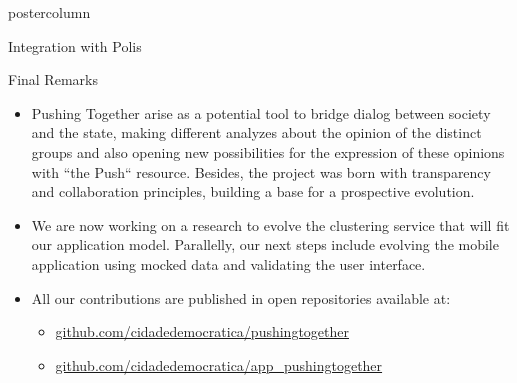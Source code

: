 \documentclass[final,hyperref={pdfpagelabels=false}]{beamer}
\begin{document}
\begin{frame}
\begin{columns}
\begin{column}{.49\textwidth}
\begin{beamercolorbox}[center,wd=\textwidth]{postercolumn}
\begin{minipage}[T]{.95\textwidth}
{\begin{block}{Integration with Polis}
\begin{itemize}
  \end{itemize}
\end{block}

\begin{block}{Final Remarks}
  \begin{itemize}
    \item Pushing Together arise as a potential tool to bridge dialog between society and
    the state, making different analyzes about the opinion of the distinct groups
    and also opening new possibilities for the expression of these opinions with ``the
    Push`` resource. Besides, the project was born with transparency and collaboration
    principles, building a base for a prospective evolution.

    \item We are now working on a research to evolve the clustering service that
    will fit our application model. Parallelly, our next steps include evolving the
    mobile application using mocked data and validating the user interface.

    \item All our contributions are published in open repositories available at:
      \begin{itemize}
        \item \url{github.com/cidadedemocratica/pushingtogether}
        \item \url{github.com/cidadedemocratica/app_pushingtogether}
      \end{itemize}
  \end{itemize}
\end{block}
      }
        \end{minipage}
      \end{beamercolorbox}
    \end{column}
  \end{columns}
\end{frame}
\end{document}
